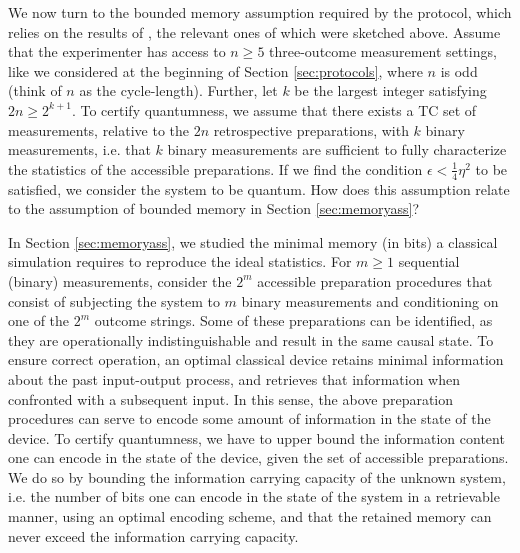 We now turn to the bounded memory assumption required by the protocol, which relies on the results of \cite{Pusey2019a}, the relevant ones of which were sketched above. Assume that the experimenter has access to $n\geq 5$ three-outcome measurement settings, like we considered at the beginning of Section \ref{sec:protocols}, where $n$ is odd (think of $n$ as the cycle-length). Further, let $k$ be the largest integer satisfying $2n\geq 2^{k+1}$. To certify quantumness, we assume that there exists a TC set of measurements, relative to the $2n$ retrospective preparations, with $k$ binary measurements, i.e. that $k$ binary measurements are sufficient to fully characterize the statistics of the accessible preparations. If we find the condition $\epsilon<\frac{1}{4}\eta^2$ to be satisfied, we consider the system to be quantum.  How does this assumption relate to the assumption of bounded memory in Section \ref{sec:memoryass}? 

In Section \ref{sec:memoryass}, we studied the minimal memory (in bits) a classical simulation requires to reproduce the ideal statistics. 
For $m\geq1$ sequential (binary) measurements, consider the $2^m$ accessible preparation procedures that consist of subjecting the system to $m$ binary measurements and conditioning on one of the $2^m$ outcome strings. Some of these preparations can be identified, as they are operationally indistinguishable and result in the same causal state. To ensure correct operation, an optimal classical device retains minimal information about the past input-output process, and retrieves that information when confronted with a subsequent input. In this sense, the above preparation procedures can serve to encode some amount of information in the state of the device. To certify quantumness, we have to upper bound the information content one can encode in the state of the device, given the set of accessible preparations. We do so by bounding the information carrying capacity of the unknown system, i.e. the number of bits one can encode in the state of the system in a retrievable manner, using an optimal encoding scheme, and that the retained memory can never exceed the information carrying capacity. 

